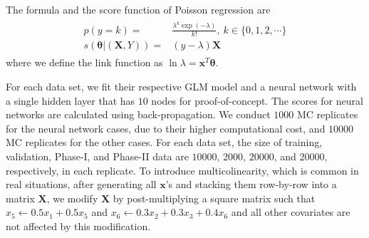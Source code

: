 \documentclass[twoside,11pt]{article}
\begin{document}
\begin{appendices}
\noindent
The formula and the score function of Poisson regression are
\begin{align}
\begin{aligned}
p(y=k)=&\frac{ \lambda ^{k} \exp(- \lambda)}{k!}, ~ k \in \{0,1,2,\cdots\} \\
s(\bm { \theta} |(\bm {X}, Y))=& (y- \lambda)\bm {X}
\end{aligned}
\label{eqn:pois_score}
\end{align}
where we define the link function as $\ln \lambda = \bm {x}^T\bm{\theta}$.

For each data set, we fit their respective GLM model and a neural network with a single hidden layer that has $10$ nodes for proof-of-concept. The scores for neural networks are calculated using back-propagation. We conduct $1000$ MC replicates for the neural network cases, due to their higher computational cost, and $10000$ MC replicates for the other cases.
For each data set, the size of training, validation, Phase-I, and Phase-II data are $10000$, $2000$, $20000$, and $20000$, respectively, in each replicate. 
To introduce multicolinearity, which is common in real situations, after generating all $\bm{x}$'s and stacking them row-by-row into a matrix $\mathbf{X}$, we modify $\mathbf{X}$ by post-multiplying a square matrix such that $x_5 \leftarrow 0.5x_1+0.5x_5$ and $x_6 \leftarrow 0.3x_2+0.3x_3+0.4x_6$ and all other covariates are not affected by this modification.


\end{appendices}
\end{document}
